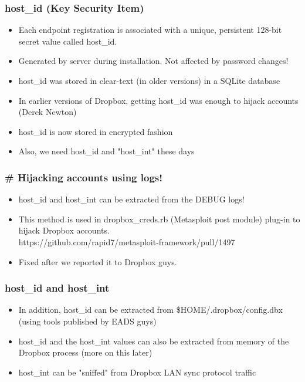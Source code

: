 \documentclass{beamer}
\newcommand\myfont{\fontsize{14}{20}\selectfont}
\begin{document}
\begin{frame}
\frametitle{host\_id (Key Security Item)}
\begin{itemize}
\itemsep 1em
\item Each endpoint registration is associated with a unique, persistent 128-bit secret value called host\_id.

\item Generated by server during installation. Not affected by password changes!

\item host\_id was stored in clear-text (in older versions) in a SQLite database

\item In earlier versions of Dropbox, getting host\_id was enough to hijack
accounts (Derek Newton)

\item host\_id is now stored in encrypted fashion

\item Also, we need host\_id and "host\_int" these days

\end{itemize}
\end{frame}

\begin{frame}
\frametitle{\# Hijacking accounts using logs!}
\myfont
\begin{itemize}
\itemsep 1em
\item host\_id and host\_int can be extracted from the DEBUG logs!
\item This method is used in dropbox\_creds.rb (Metasploit post module) plug-in
to hijack Dropbox accounts. \\
 \vspace{1em} {\small https://github.com/rapid7/metasploit-framework/pull/1497}
\item Fixed after we reported it to Dropbox guys.
\end{itemize}
\end{frame}

\begin{frame}
\frametitle{host\_id and host\_int}
\myfont
\begin{itemize}
\itemsep 1em
\item In addition, host\_id can be extracted from \$HOME/.dropbox/config.dbx (using tools published by EADS guys)
\item host\_id and the host\_int values can also be extracted from memory of the Dropbox process (more on this later)
\item host\_int can be "sniffed" from Dropbox LAN sync protocol traffic
\end{itemize}
\end{frame}
\end{document}
